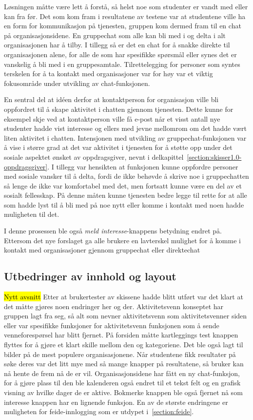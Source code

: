 Løsningen måtte være lett å forstå, så helst noe som studenter er vandt med eller kan fra før. Det som kom fram i resultatene av testene var at studentene ville ha en form for kommunikasjon på tjenesten, gruppen kom dermed fram til en chat på organisasjonsidene. En gruppechat som alle kan bli med i og delta i alt organisasjonen har å tilby. I tillegg så er det en chat for å snakke direkte til organisasjonen alene, for alle de som har spesifikke spørsmål eller synes det er vanskelig å bli med i en gruppesamtale. Tilrettelegging for personer som syntes terskelen for å ta kontakt med organisasjoner var for høy var et viktig fokusområde under utvikling av chat-funksjonen. 

En sentral del at idéen derfor at kontaktperson for organisasjon ville bli oppfordret til å skape aktivitet i chatten gjennom tjenesten. Dette kunne for eksempel skje ved at kontaktperson ville få e-post når et visst antall nye studenter hadde vist interesse og ellers med jevne mellomrom om det hadde vært liten aktivitet i chatten. Intensjonen med utvikling av gruppechat-funksjonen var å vise i større grad at det var aktivitet i tjenesten for å støtte opp under det sosiale aspektet ønsket av oppdragsgiver, nevnt i delkapittel~\ref{section:skisser1.0-oppdragsgiver}. I tillegg var hensikten at funksjonen kunne oppfordre personer med sosiale vansker til å delta, fordi de ikke behøvde å skrive noe i gruppechatten så lenge de ikke var komfortabel med det, men fortsatt kunne være en del av et sosialt fellesskap. På denne måten kunne tjenesten bedre legge til rette for at alle som hadde lyst til å bli med på noe nytt eller komme i kontakt med noen hadde muligheten til det.

I denne prosessen ble også {\em meld interesse}-knappens betydning endret på. Ettersom det nye forslaget ga alle brukere en lavterskel mulighet for å komme i kontakt med organisasjoner gjennom gruppechat eller direktechat

\subsection{Utbedringer av innhold og layout}
\hl{Nytt avsnitt}
Etter at brukertester av skissene hadde blitt utført var det klart at det måtte gjøres noen endringer her og der. Aktivitetsvenn konseptet har gruppen lagt fra seg, så alt som nevner aktivitetsvenn som aktivitetsvenner siden eller var spesifikke funksjoner for aktivitetsvenn funksjonen som å sende venneforespørsel har blitt fjernet. På forsiden måtte kartleggings test knappen flyttes for å gjøre et klart skille mellom den og kategoriene. Det ble også lagt til bilder på de mest populere organisasjonene. Når studentene fikk resultater på søke deres var det litt mye med så mange knapper på resultatene, så bruker kan nå hente de frem nå de er vil. Organisasjonsidene har fått en ny chat-funksjon, for å gjøre plass til den ble kalenderen også endret til et tekst felt og en grafisk visning av hvilke dager de er aktive. Bokmerke knappen ble også fjernet nå som interesse knappen har en lignende funksjon. En av de største endringene er muligheten for feide-innlogging som er utdypet i~\ref{section:feide}. 


